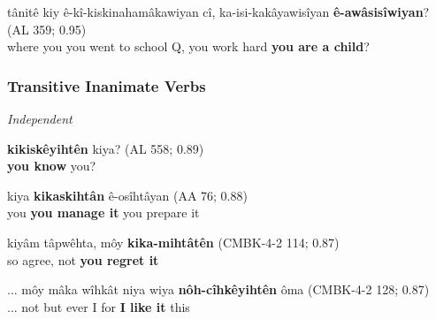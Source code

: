     \begin{exe}
    \ex
    \gll tânitê kiy ê-kî-kiskinahamâkawiyan cî, ka-isi-kakâyawisîyan \textbf{ê-awâsisîwiyan}? (AL 359; 0.95) \\
         where you {you went to school} Q, {you work hard} {\textbf{you are a child}}?
    \trans  \\
    \label{ti-ive10}
    \end{exe}
    
    
    
    
    
    
    
    
    

\subsubsection{Transitive Inanimate Verbs}

\textit{Independent}
    
        \begin{exe}
    \ex
    \gll \textbf{kikiskêyihtên} kiya? \tiny{(AL 558; 0.89)} \\
         {\textbf{you know}} you?\\
    \trans
    \label{ti-ive2}
    \end{exe}
    
    \begin{exe}
    \ex 
    \gll kiya \textbf{kikaskihtân} ê-osîhtâyan \tiny{(AA 76; 0.88)} \\
     you {\textbf{you manage it}} {you prepare it} \\
    \trans 
    \label{ti-ive3}
    \end{exe}
    
    \begin{exe}
    \ex
    \gll kiyâm tâpwêhta, môy \textbf{kika-mihtâtên} \tiny{(CMBK-4-2 114; 0.87)}\\
      so agree, not {\textbf{you regret it}}    \\
    \trans  
    \label{ti-ive4}
    \end{exe}
    
    \begin{exe}
    \ex
    \gll ... môy mâka wîhkât niya wiya \textbf{nôh-cîhkêyihtên} ôma \tiny{(CMBK-4-2 128; 0.87)} \\
        ... not but  ever I for {\textbf{I like it}} this \\
    \label{ti-ive5}
    \end{exe}

